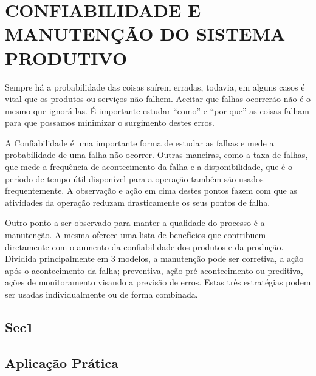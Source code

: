\chapter{CONFIABILIDADE E MANUTENÇÃO DO SISTEMA PRODUTIVO}
\label{chap:confiabilidade_manutencao_do_sistema_produtivo}
Sempre há a probabilidade das coisas saírem erradas, todavia, em alguns casos é vital que os produtos ou serviços não falhem. Aceitar que falhas ocorrerão não é o mesmo que ignorá-las. É importante estudar ``como'' e ``por que'' as coisas falham para que possamos minimizar o surgimento destes erros.

A Confiabilidade é uma importante forma de estudar as falhas e mede a probabilidade de uma falha não ocorrer. Outras maneiras, como a taxa de falhas, que mede a frequência de acontecimento da falha e a disponibilidade, que é o período de tempo útil disponível para a operação também são usados frequentemente. A observação e ação em cima destes pontos fazem com que as atividades da operação reduzam drasticamente os seus pontos de falha.

Outro ponto a ser observado para manter a qualidade do processo é a manutenção. A mesma oferece uma lista de benefícios que contribuem diretamente com o aumento da confiabilidade dos produtos e da produção. Dividida principalmente em 3 modelos, a manutenção pode ser corretiva, a ação após o acontecimento da falha; preventiva, ação pré-acontecimento ou preditiva, ações de monitoramento visando a previsão de erros. Estas três estratégias podem ser usadas individualmente ou de forma combinada.

\section{Sec1}
\label{sec:confiabilidade_manutencao_sec1}




\section{Aplicação Prática}
\label{sec:confiabilidade_manutencao_aplicacao}
